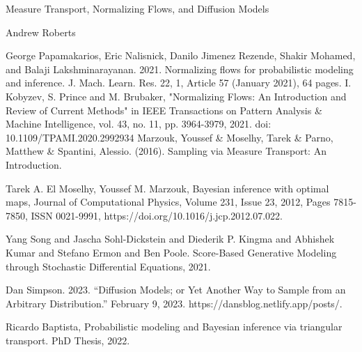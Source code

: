 \documentclass[12pt]{article}
\begin{document}
\begin{center}
\Large
Measure Transport, Normalizing Flows, and Diffusion Models 
\end{center}

\begin{flushright}
Andrew Roberts
\end{flushright} 


\begin{thebibliography}{20}
 George Papamakarios, Eric Nalisnick, Danilo Jimenez Rezende, Shakir Mohamed, and Balaji Lakshminarayanan. 2021. Normalizing flows for probabilistic modeling and inference. J. Mach. Learn. Res. 22, 1, Article 57 (January 2021), 64 pages.
 I. Kobyzev, S. Prince and M. Brubaker, "Normalizing Flows: An Introduction and Review of Current Methods" in IEEE Transactions on Pattern Analysis \& Machine Intelligence, vol. 43, no. 11, pp. 3964-3979, 2021. doi: 10.1109/TPAMI.2020.2992934
 Marzouk, Youssef \& Moselhy, Tarek \& Parno, Matthew \& Spantini, Alessio. (2016). Sampling via Measure Transport: An Introduction. 

 Tarek A. El Moselhy, Youssef M. Marzouk, Bayesian inference with optimal maps, Journal of Computational Physics, Volume 231, Issue 23, 2012, Pages 7815-7850, ISSN 0021-9991, https://doi.org/10.1016/j.jcp.2012.07.022.

 Yang Song and Jascha Sohl-Dickstein and Diederik P. Kingma and Abhishek Kumar and Stefano Ermon and Ben Poole. Score-Based Generative Modeling through Stochastic Differential Equations, 2021. 

 Dan Simpson. 2023. “Diffusion Models; or Yet Another Way to Sample from an Arbitrary Distribution.” February 9, 2023. https://dansblog.netlify.app/posts/.

 Ricardo Baptista, Probabilistic modeling and Bayesian inference via triangular transport. PhD Thesis, 2022. 

\end{thebibliography}
\end{document}

